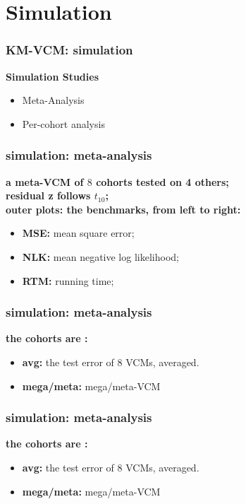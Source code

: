 \documentclass{beamer}
\begin{document}
\section{Simulation}
\begin{frame}
  \frametitle{KM-VCM: simulation} %
  \centering
  \Large{\textbf{Simulation Studies}}
  \normalsize
  \begin{itemize}
  \item Meta-Analysis
  \item Per-cohort analysis
  \end{itemize}
\end{frame}
\begin{frame}\frametitle{simulation: meta-analysis}
  \textbf{a meta-VCM of $8$ cohorts tested on 4 others;} \\
  \textbf{residual z follows $t_{10}$;} \\
  {\color{blue}\textbf{outer plots: the benchmarks, from left to right:}}
  \begin{itemize}
  \item \textbf{MSE:} mean square error;
  \item \textbf{NLK:} mean negative log likelihood;
  \item \textbf{RTM:} running time;
  \end{itemize}
\end{frame}
\begin{frame} \frametitle{simulation: meta-analysis}
  \textbf{the cohorts are \color{blue}{homogeneous}:} \\
  \textbf{\color{blue}{inner plot: strategies, from left to right:}}
  \begin{itemize}
  \item \textbf{avg:} the test error of 8 VCMs, averaged.
  \item \textbf{mega/meta:} mega/meta-VCM
  \end{itemize}
\end{frame}
\begin{frame}%
  \frametitle{simulation: meta-analysis} %
  \textbf{the cohorts are \color{red}{heterogeneous}:} \\
  \textbf{\color{blue}{inner plot: strategies, from left to right:}}
  \begin{itemize}
  \item \textbf{avg:} the test error of 8 VCMs, averaged.
  \item \textbf{mega/meta:} mega/meta-VCM
  \end{itemize}
\end{frame}
\end{document}
